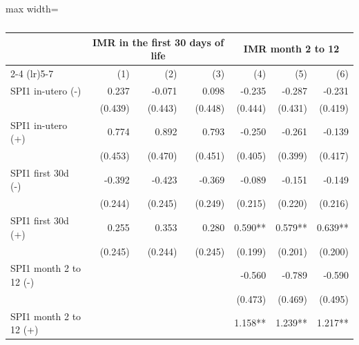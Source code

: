 \begin{table}[H]
\centering
\caption{}
\label{table1}
\begin{adjustbox}{max width=\linewidth}
\begin{tabular}{lrrrrrr}
\toprule
                                            &      \multicolumn{3}{c}{IMR in the first 30 days of life}     &   \multicolumn{3}{c}{IMR month 2 to 12}      \\ 
\cmidrule(lr){2-4} \cmidrule(lr){5-7} 
                                            &          (1) &        (2)  &        (3)   &       (4) &       (5) &       (6)  \\ 
\midrule 
SPI1 in-utero (-)                           &      0.237  &     -0.071  &      0.098   &     -0.235   &     -0.287   &    -0.231    \\  
                                            &    (0.439)  &    (0.443)  &    (0.448)   &    (0.444)   &    (0.431)   &   (0.419)    \\  
SPI1 in-utero (+)                           &      0.774  &      0.892  &      0.793   &     -0.250   &     -0.261   &    -0.139    \\  
                                            &    (0.453)  &    (0.470)  &    (0.451)   &    (0.405)   &    (0.399)   &   (0.417)    \\  
SPI1 first 30d (-)                          &     -0.392  &     -0.423  &     -0.369   &     -0.089   &     -0.151   &    -0.149    \\
                                            &    (0.244)  &    (0.245)  &    (0.249)   &    (0.215)   &    (0.220)   &   (0.216)    \\
SPI1 first 30d (+)                          &      0.255  &      0.353  &      0.280   &    0.590**   &    0.579**   &   0.639**    \\
                                            &    (0.245)  &    (0.244)  &    (0.245)   &    (0.199)   &    (0.201)   &   (0.200)    \\
SPI1 month 2 to 12  (-)                     &             &             &              &     -0.560   &     -0.789   &    -0.590    \\ 
                                            &             &             &              &    (0.473)   &    (0.469)   &   (0.495)    \\ 
SPI1 month 2 to 12 (+)                      &             &             &              &    1.158**   &    1.239**   &   1.217**    \\ 

\end{tabular}
\end{adjustbox}
\end{table}
